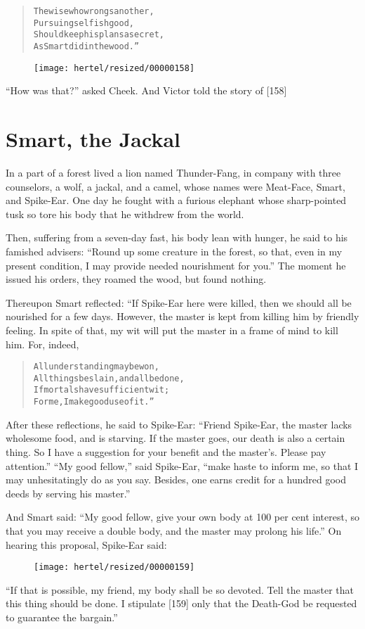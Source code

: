 \documentclass[article, twoside, 10pt]{memoir}
\renewenvironment{verbatim}{%
\begin{quote}%
\vskip -10pt%
\begin{alltt}\normalfont\small}{\end{alltt}%
\end{quote}%
\vskip -10pt
} %
\begin{document}
\begin{verbatim}
The wise who wrongs another,
    Pursuing selfish good,
Should keep his plans a secret,
    As Smart did in the wood.”
\end{verbatim}
\begin{figure}[p]\texttt{[image: hertel/resized/00000158]}\end{figure}``How was that?'' asked Cheek. And Victor told the story of [158]

\chapter{Smart, the Jackal}

In a part of a forest lived a lion named Thunder-Fang, in company
with three counselors, a wolf, a jackal, and a camel, whose names
were Meat-Face, Smart, and Spike-Ear. One day he fought with a
furious elephant whose sharp-pointed tusk so tore his body that he
withdrew from the world.

Then, suffering from a seven-day fast, his body lean with hunger,
he said to his famished advisers:
``Round up some creature in the forest, so that, even in my present condition, I may provide needed nourishment for you.''
The moment he issued his orders, they roamed the wood, but found
nothing.

Thereupon Smart reflected: “If Spike-Ear here were killed, then we
should all be nourished for a few days. However, the master is kept
from killing him by friendly feeling. In spite of that, my wit will
put the master in a frame of mind to kill him. For, indeed,

\begin{verbatim}
All understanding may be won,
All things be slain, and all be done,
If mortals have sufficient wit;
For me, I make good use of it.”
\end{verbatim}
After these reflections, he said to Spike-Ear:
``Friend Spike-Ear, the master lacks wholesome food, and is starving. If the master goes, our death is also a certain thing. So I have a suggestion for your benefit and the master's. Please pay attention.''
``My good fellow,'' said Spike-Ear,
``make haste to inform me, so that I may unhesitatingly do as you say. Besides, one earns credit for a hundred good deeds by serving his master.''

And Smart said:
``My good fellow, give your own body at 100 per cent interest, so that you may receive a double body, and the master may prolong his life.''
On hearing this proposal, Spike-Ear said:
\begin{figure}[p]\texttt{[image: hertel/resized/00000159]}\end{figure}``If that is possible, my friend, my body shall be so devoted. Tell the master that this thing should be done. I stipulate [159] only that the Death-God be requested to guarantee the bargain.''
\end{document}
